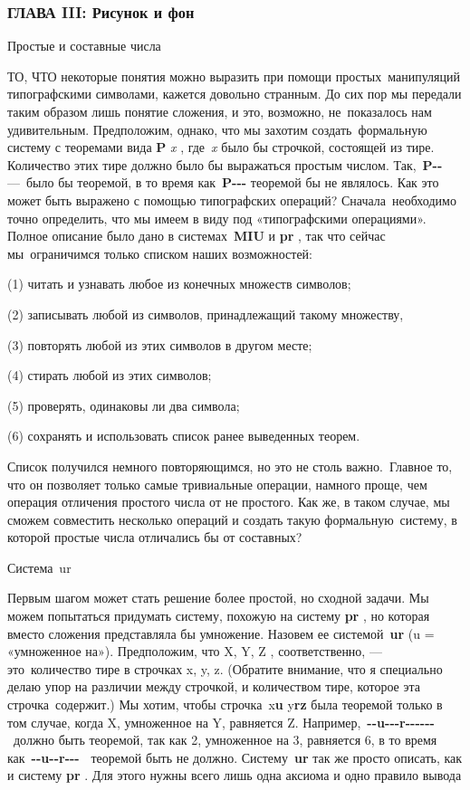 \subsubsection{ГЛАВА III: Рисунок и фон}

Простые и составные числа

ТО, ЧТО некоторые понятия можно выразить при помощи простых~манипуляций типографскими символами, кажется довольно странным. До сих пор мы передали таким образом лишь понятие сложения, и это, возможно, не~показалось нам удивительным. Предположим, однако, что мы захотим создать~формальную систему с теоремами вида \textbf{P} \emph{x} , где~\emph{x} было бы строчкой, состоящей из тире. Количество этих тире должно было бы выражаться простым числом. Так,~\textbf{P-\/-~} ---~было бы теоремой, в то время как~\textbf{P-\/-\/-} теоремой бы не являлось. Как это может быть выражено с помощью типографских операций? Сначала~необходимо точно определить, что мы имеем в виду под «типографскими операциями». Полное описание было дано в системах~\textbf{MIU} и \textbf{pr} , так что сейчас мы~ограничимся только списком наших возможностей:

(1) читать и узнавать любое из конечных множеств символов;

(2) записывать любой из символов, принадлежащий такому множеству,

(3) повторять любой из этих символов в другом месте;

(4) стирать любой из этих символов;

(5) проверять, одинаковы ли два символа;

(6) сохранять и использовать список ранее выведенных теорем.

Список получился немного повторяющимся, но это не столь важно.~Главное то, что он позволяет только самые тривиальные операции, намного проще, чем операция отличения простого числа от не простого. Как же, в таком случае, мы сможем совместить несколько операций и создать такую формальную~систему, в которой простые числа отличались бы от составных?

Система~ur

Первым шагом может стать решение более простой, но сходной задачи. Мы можем попытаться придумать систему, похожую на систему \textbf{pr} , но которая вместо сложения представляла бы умножение. Назовем ее системой~\textbf{ur} (u = «умноженное на»). Предположим, что X, Y, Z , соответственно, --- это~количество тире в строчках x, y, z. (Обратите внимание, что я специально делаю упор на различии между строчкой, и количеством тире, которое эта строчка~содержит.) Мы хотим, чтобы строчка~x\textbf{u} y\textbf{rz} была теоремой только в том случае, когда X, умноженное на Y, равняется Z. Например,~\textbf{-\/-u-\/-\/-r-\/-\/-\/-\/-\/-} ~должно быть теоремой, так как 2, умноженное на 3, равняется 6, в то время как~\textbf{-\/-u-\/-r-\/-\/-~} теоремой быть не должно. Систему~\textbf{ur} так же просто описать, как и систему \textbf{pr} . Для этого нужны всего лишь одна аксиома и одно правило вывода

